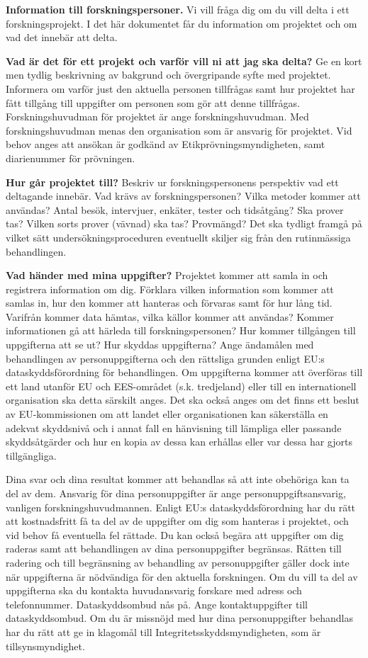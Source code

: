 \documentclass[
]{book}
\begin{document}
\textbf{Information till forskningspersoner.} Vi vill fråga dig om du vill delta i ett forskningsprojekt. I det här dokumentet får du information om projektet och om vad det innebär att delta.

\textbf{Vad är det för ett projekt och varför vill ni att jag ska delta?} Ge en kort men tydlig beskrivning av bakgrund och övergripande syfte med projektet. Informera om varför just den aktuella personen tillfrågas samt hur projektet har fått tillgång till uppgifter om personen som gör att denne tillfrågas. Forskningshuvudman för projektet är ange forskningshuvudman. Med forskningshuvudman menas den organisation som är ansvarig för projektet. Vid behov anges att ansökan är godkänd av Etikprövningsmyndigheten, samt diarienummer för prövningen.

\textbf{Hur går projektet till?} Beskriv ur forskningspersonens perspektiv vad ett deltagande innebär. Vad krävs av forskningspersonen? Vilka metoder kommer att användas? Antal besök, intervjuer, enkäter, tester och tidsåtgång? Ska prover tas? Vilken sorts prover (vävnad) ska tas? Provmängd? Det ska tydligt framgå på vilket sätt undersökningsproceduren eventuellt skiljer sig från den rutinmässiga behandlingen.

\textbf{Vad händer med mina uppgifter?} Projektet kommer att samla in och registrera information om dig. Förklara vilken information som kommer att samlas in, hur den kommer att hanteras och förvaras samt för hur lång tid. Varifrån kommer data hämtas, vilka källor kommer att användas? Kommer informationen gå att härleda till forskningspersonen? Hur kommer tillgången till uppgifterna att se ut? Hur skyddas uppgifterna? Ange ändamålen med behandlingen av personuppgifterna och den rättsliga grunden enligt EU:s dataskyddsförordning för behandlingen. Om uppgifterna kommer att överföras till ett land utanför EU och EES-området (s.k. tredjeland) eller till en internationell organisation ska detta särskilt anges. Det ska också anges om det finns ett beslut av EU-kommissionen om att landet eller organisationen kan säkerställa en adekvat skyddsnivå och i annat fall en hänvisning till lämpliga eller passande skyddsåtgärder och hur en kopia av dessa kan erhållas eller var dessa har gjorts tillgängliga.

Dina svar och dina resultat kommer att behandlas så att inte obehöriga kan ta del av dem. Ansvarig för dina personuppgifter är ange personuppgiftsansvarig, vanligen forskningshuvudmannen. Enligt EU:s dataskyddsförordning har du rätt att kostnadsfritt få ta del av de uppgifter om dig som hanteras i projektet, och vid behov få eventuella fel rättade. Du kan också begära att uppgifter om dig raderas samt att behandlingen av dina personuppgifter begränsas. Rätten till radering och till begränsning av behandling av personuppgifter gäller dock inte när uppgifterna är nödvändiga för den aktuella forskningen. Om du vill ta del av uppgifterna ska du kontakta huvudansvarig forskare med adress och telefonnummer. Dataskyddsombud nås på. Ange kontaktuppgifter till dataskyddsombud. Om du är missnöjd med hur dina personuppgifter behandlas har du rätt att ge in klagomål till Integritetsskyddsmyndigheten, som är tillsynsmyndighet.
\end{document}
